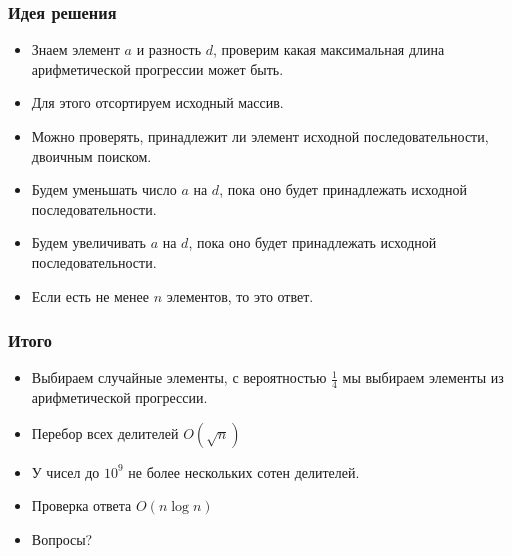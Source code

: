 \begin{frame}
  \frametitle{Идея решения}
  \begin{itemize}
	\item Знаем элемент $a$ и разность $d$, проверим какая максимальная длина арифметической прогрессии может быть.
	\item Для этого отсортируем исходный массив.
	\item Можно проверять, принадлежит ли элемент исходной последовательности, двоичным поиском.
	\item Будем уменьшать число $a$ на $d$, пока оно будет принадлежать исходной последовательности.
	\item Будем увеличивать $a$ на $d$, пока оно будет принадлежать исходной последовательности.
	\item Если есть не менее $n$ элементов, то это ответ.
  \end{itemize}
\end{frame}



\begin{frame}
  \frametitle{Итого}
  \begin{itemize}
    \item Выбираем случайные элементы, с вероятностью $\frac{1}{4}$ мы выбираем элементы из арифметической прогрессии.
    \item Перебор всех делителей $O(\sqrt{n})$
    \item У чисел до $10^9$ не более нескольких сотен делителей.
    \item Проверка ответа $O(n \log n)$
    \item Вопросы?
  \end{itemize}
\end{frame}

